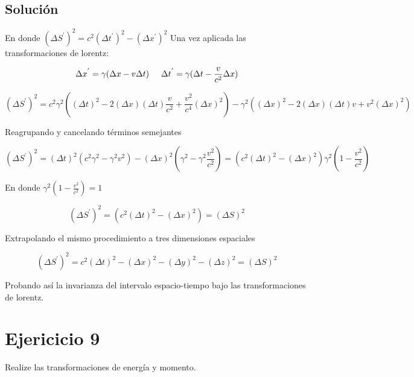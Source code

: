 \documentclass[12 pt]{article}
\begin{document}
\subsection*{Solución}
En donde $ (\Delta S^{'})^{2} =  c^{2}(\Delta t^{'})^{2} - (\Delta x^{'})^{2}$
Una vez aplicada las transformaciones de lorentz:

\begin{equation*}
 \Delta x ^{'}= \gamma (\Delta x - v \Delta t) \hspace{0.5cm} \Delta t^{'}= \gamma(\Delta t - \frac{v}{c^{2}}\Delta x)
\end{equation*}



\begin{equation*}
(\Delta S^{'})^{2} = c^{2} \gamma^{2} \left((\Delta t)^{2} - 2 (\Delta x)(\Delta t) \frac{v}{c^{2}} + \frac{v^{2}}{c^{4}} (\Delta x)^{2} \right) - \gamma^{2} \left( (\Delta x)^{2} - 2 (\Delta x)(\Delta t)v + v^ {2}(\Delta x)^{2} \right) 
\end{equation*}



Reagrupando y cancelando términos semejantes

\begin{equation*}
(\Delta S^{'})^{2} = (\Delta t)^{2} \left(  c^{2} \gamma^{2}- \gamma^{2} v^{2}\right) - (\Delta x)^{2} \left( \gamma^{2} - \gamma^{2}\frac{v^{2}}{c^{2}}  \right)  = \left( c^{2} (\Delta t)^{2} - (\Delta x)^{2}\right)  \gamma^{2} \left( 1 - \frac{v^{2}}{c^{2}}  \right) 
\end{equation*}


En donde $\gamma^{2} \left( 1 - \frac{v^{2}}{c^{2}}  \right)  = 1 $


\begin{equation*}
(\Delta S^{'})^{2} =\left( c^{2} (\Delta t)^{2} - (\Delta x)^{2}\right)  = (\Delta S)^{2}
\end{equation*}


Extrapolando el mismo procedimiento a tres dimensiones espaciales

\begin{equation*}
(\Delta S^{'})^{2} = c^{2} (\Delta t)^{2} - (\Delta x)^{2} - (\Delta y)^{2}- (\Delta z)^{2} = (\Delta S)^{2}
\end{equation*}


Probando así la invarianza del intervalo espacio-tiempo bajo las transformaciones de lorentz.


\section*{Ejericicio 9}
Realize las transformaciones de energía y momento.
\end{document}
